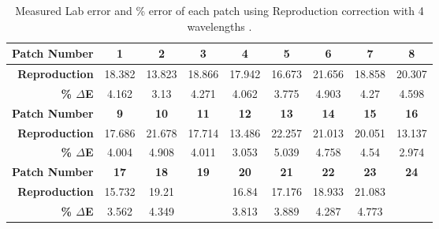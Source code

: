 \begin{table}[H]
  \caption{Measured Lab error and \% error of each patch using Reproduction correction with 4 wavelengths .}\n  \begin{center}
    \begin{tabularx}{\textwidth}{r c c c c c c c c}
    \toprule
        \textbf{Patch Number} & \textbf{1} & \textbf{2} & \textbf{3} & \textbf{4} & \textbf{5} & \textbf{6} & \textbf{7} & \textbf{8}\\ \midrule 
        \textbf{Reproduction} &18.382 &13.823 &18.866 &17.942 &16.673 &21.656 &18.858 &20.307\\ 
        \textbf{\textbf{\% $\Delta$E}} &4.162 &3.13 &4.271 &4.062 &3.775 &4.903 &4.27 &4.598\\ \midrule 
        \textbf{Patch Number} & \textbf{9} & \textbf{10} & \textbf{11} & \textbf{12} & \textbf{13} & \textbf{14} & \textbf{15} & \textbf{16}\\ \midrule 
        \textbf{Reproduction} &17.686 &21.678 &17.714 &13.486 &22.257 &21.013 &20.051 &13.137\\ 
        \textbf{\textbf{\% $\Delta$E}} &4.004 &4.908 &4.011 &3.053 &5.039 &4.758 &4.54 &2.974\\ \midrule 
        \textbf{Patch Number} & \textbf{17} & \textbf{18} & \textbf{19} & \textbf{20} & \textbf{21} & \textbf{22} & \textbf{23} & \textbf{24}\\ \midrule 
        \textbf{Reproduction} &15.732 &19.21 &\cellcolor{colorgreen}{8.956} &16.84 &17.176 &18.933 &21.083 &\cellcolor{colorred}{26.841}\\ 
        \textbf{\textbf{\% $\Delta$E}} &3.562 &4.349 &\cellcolor{colorgreen}{2.028} &3.813 &3.889 &4.287 &4.773 &\cellcolor{colorred}{6.077}\\ \midrule 
    \bottomrule
    \end{tabularx}
  \end{center}
\end{table}

